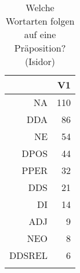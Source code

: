 \begin{table}[ht]
\centering
\begin{tabular}{rr}
  \lsptoprule
 & V1 \\ 
  \midrule
NA & 110 \\ 
  DDA &  86 \\ 
  NE &  54 \\ 
  DPOS &  44 \\ 
  PPER &  32 \\ 
  DDS &  21 \\ 
  DI &  14 \\ 
  ADJ &   9 \\ 
  NEO &   8 \\ 
  DDSREL &   6 \\ 
   \lspbottomrule
\end{tabular}
\caption{Welche Wortarten folgen auf eine Präposition?  (Isidor)} 
\end{table}
